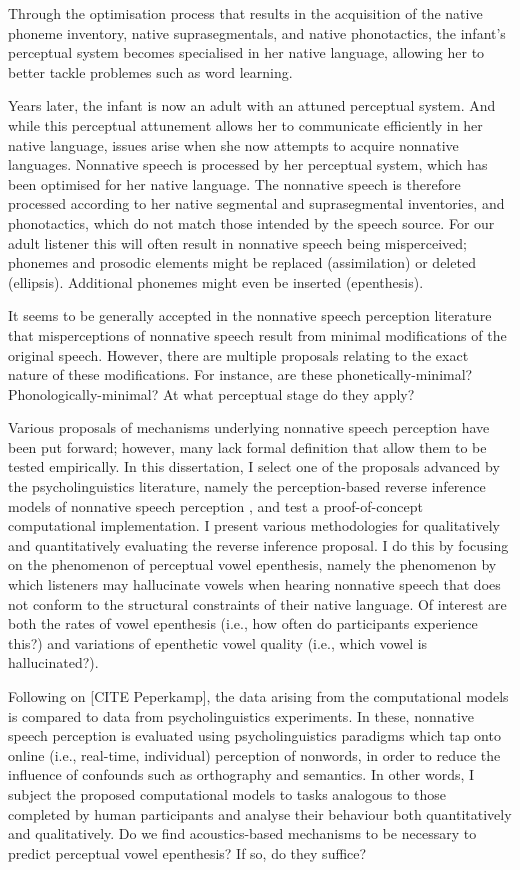 Through the optimisation process that results in the acquisition of the native phoneme inventory, native suprasegmentals, and native phonotactics, the infant's perceptual system becomes specialised in her native language, allowing her to better tackle problemes such as word learning.  

Years later, the infant is now an adult with an attuned perceptual system. 
And while this perceptual attunement allows her to communicate efficiently in her native language, issues arise when she now attempts to acquire nonnative languages.
Nonnative speech is processed by her perceptual system, which has been optimised for her native language. The nonnative speech is therefore processed according to her native segmental and suprasegmental inventories, and phonotactics, which do not match those intended by the speech source. 
For our adult listener this will often result in nonnative speech being misperceived; phonemes and prosodic elements might be replaced (assimilation) or deleted (ellipsis). Additional phonemes might even be inserted (epenthesis).

It seems to be generally accepted in the nonnative speech perception literature that misperceptions of nonnative speech result from minimal modifications of the original speech. However, there are multiple proposals relating to the exact nature of these modifications. For instance, are these phonetically-minimal? Phonologically-minimal? At what perceptual stage do they apply? 

Various proposals of mechanisms underlying nonnative speech perception have been put forward; however, many lack formal definition that allow them to be tested empirically.  
In this dissertation, I select one of the proposals advanced by the psycholinguistics literature, namely the perception-based reverse inference models of nonnative speech perception \cite{dupoux2011, wilson2013}, and test a proof-of-concept computational implementation. 
I present various methodologies for qualitatively and quantitatively evaluating the reverse inference proposal. I do this by focusing on the phenomenon of perceptual vowel epenthesis, namely the phenomenon by which listeners may hallucinate vowels when hearing nonnative speech that does not conform to the structural constraints of their native language. Of interest are both the rates of vowel epenthesis (i.e., how often do participants experience this?) and variations of epenthetic vowel quality (i.e., which vowel is hallucinated?).

Following on [CITE Peperkamp], the data arising from the computational models is compared to data from psycholinguistics experiments. In these, nonnative speech perception is evaluated using psycholinguistics paradigms which tap onto online (i.e., real-time, individual) perception of nonwords, in order to reduce the influence of confounds such as orthography and semantics.
In other words, I subject the proposed computational models to tasks analogous to those completed by human participants and analyse their behaviour both quantitatively and qualitatively. Do we find acoustics-based mechanisms to be necessary to predict perceptual vowel epenthesis? If so, do they suffice? 

